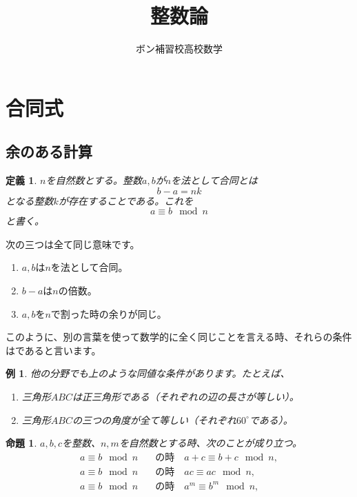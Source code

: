 \documentclass{ltjsarticle}
\title{整数論}
\author{ボン補習校高校数学}
\date{}
\newtheorem{proposition}{命題}[section]
\newtheorem{definition}{定義}[section]
\newtheorem{example}{例}[section]
\begin{document}
\maketitle

\section{合同式}
\subsection{余のある計算}

\begin{definition}
$n$を自然数とする。整数$a,b$が$n$を法として合同とは
\begin{equation*}
b-a=nk
\end{equation*}
となる整数$k$が存在することである。これを
\begin{equation*}
a\equiv b \mod{n}
\end{equation*}
と書く。
\end{definition}

次の三つは全て同じ意味です。
\begin{center}
\begin{enumerate}[1).]
\item $a,b$は$n$を法として合同。
\item $b-a$は$n$の倍数。
\item $a,b$を$n$で割った時の余りが同じ。
\end{enumerate}
\end{center}

このように、別の言葉を使って数学的に全く同じことを言える時、それらの条件はであると言います。

\begin{example}他の分野でも上のような同値な条件があります。たとえば、
\begin{enumerate}[1).]
\item 三角形$ABC$は正三角形である（それぞれの辺の長さが等しい）。
\item 三角形$ABC$の三つの角度が全て等しい（それぞれ$60^\circ$である）。
\end{enumerate}
\end{example} 

\begin{proposition}
$a,b,c$を整数、$n,m$を自然数とする時、次のことが成り立つ。
\begin{align*}
a\equiv b \mod{n}&\text{　の時　} a+c\equiv b+c\mod{n},\\
a\equiv b \mod{n}&\text{　の時　} ac\equiv ac\mod{n},\\
a\equiv b \mod{n}&\text{　の時　} a^m\equiv b^m\mod{n},\\
\end{align*}
\end{proposition}
\end{document}
